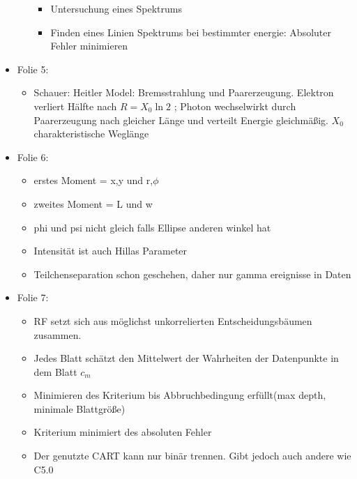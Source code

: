 \documentclass[
  bibliography=totoc,     %
  captions=tableheading,  %
  titlepage=firstiscover, %
]{scrartcl}
\begin{document}
\begin{itemize}
\begin{itemize}
\begin{itemize}
          \item Untersuchung eines Spektrums
          \item Finden eines Linien Spektrums bei bestimmter energie: Absoluter Fehler minimieren
        \end{itemize}
      \end{itemize}
    \item Folie 5:
        \begin{itemize}
          \item Schauer: Heitler Model: Bremsstrahlung und Paarerzeugung. Elektron verliert Hälfte nach $R=X_0 \ln2$ ; Photon wechselwirkt durch
                Paarerzeugung nach gleicher Länge und verteilt Energie gleichmäßig. $X_0$ charakteristische Weglänge
        \end{itemize}
    \item Folie 6:
      \begin{itemize}
        \item erstes Moment = x,y und r,$\phi$
        \item zweites Moment = L und w
        \item phi und psi nicht gleich falls Ellipse anderen winkel hat
        \item Intensität ist auch Hillas Parameter
        \item Teilchenseparation schon geschehen, daher nur gamma ereignisse in Daten
      \end{itemize}
    \item Folie 7:
      \begin{itemize}
        \item RF setzt sich aus möglichst unkorrelierten Entscheidungsbäumen zusammen.
        \item Jedes Blatt schätzt den Mittelwert der Wahrheiten der Datenpunkte in dem Blatt $c_m$
        \item Minimieren des Kriterium bis Abbruchbedingung erfüllt(max depth, minimale Blattgröße)
        \item Kriterium minimiert des absoluten Fehler
        \item Der genutzte CART kann nur binär trennen. Gibt jedoch auch andere wie C5.0


\end{itemize}
\end{itemize}
\end{document}

